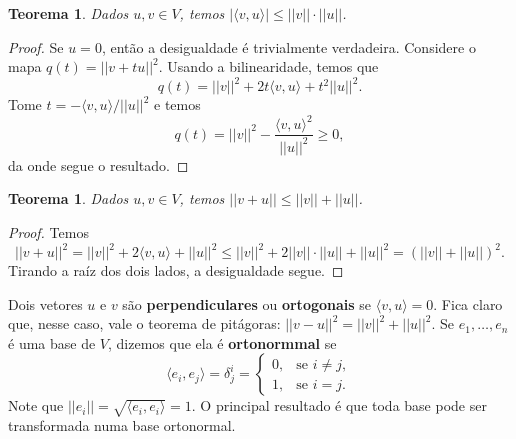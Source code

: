 \documentclass{article}
\newtheorem{theorem}[definition]{Teorema}
\begin{document}
\begin{theorem}
    Dados $u, v \in V$, temos $|\langle v, u \rangle| \leq ||v||\cdot||u||$.
\end{theorem}
\begin{proof}
    Se $u = 0$, então a desigualdade é trivialmente verdadeira. Considere o mapa $q(t) = ||v + tu||^2$. Usando a bilinearidade, temos que \begin{equation}
        q(t) = ||v||^2 + 2t\langle v, u \rangle + t^2||u||^2.
    \end{equation} Tome $t = -\langle v, u \rangle/||u||^2$ e temos \begin{equation}
        q(t) = ||v||^2 - \frac{\langle v, u \rangle^2}{||u||^2} \geq 0,
    \end{equation} da onde segue o resultado.
\end{proof}

\begin{theorem}
    Dados $u, v \in V$, temos $||v + u|| \leq ||v|| + ||u||$.
\end{theorem}
\begin{proof}
    Temos \begin{equation}
        ||v + u||^2 = ||v||^2 + 2\langle v, u \rangle + ||u||^2 \leq ||v||^2 + 2||v||\cdot||u|| + ||u||^2 = (||v|| + ||u||)^2.
    \end{equation} Tirando a raíz dos dois lados, a desigualdade segue.
\end{proof}

Dois vetores $u$ e $v$ são \textbf{perpendiculares} ou \textbf{ortogonais} se $\langle v, u \rangle = 0$. Fica claro que, nesse caso, vale o teorema de pitágoras: $||v - u||^2 = ||v||^2 + ||u||^2$. Se $e_1, \dots, e_n$ é uma base de $V$, dizemos que ela é \textbf{ortonormmal} se \begin{equation}
    \langle e_i, e_j \rangle = \delta^i_j = \begin{cases}
        0, &\text{se } i \neq j, \\ 1, &\text{se } i = j.
    \end{cases}
\end{equation} Note que $||e_i|| = \sqrt{\langle e_i, e_i \rangle} = 1$. O principal resultado é que toda base pode ser transformada numa base ortonormal.
\end{document}
